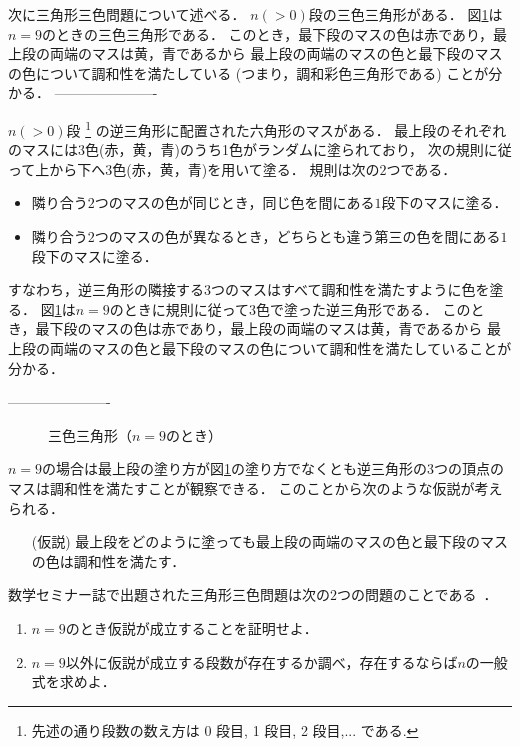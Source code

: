 次に三角形三色問題について述べる．
{\color{red}
  $n(>0)$段の三色三角形がある．
  図\ref{fig:nine_steps}は$n=9$のときの三色三角形である．
  このとき，最下段のマスの色は赤であり，最上段の両端のマスは黄，青であるから
  最上段の両端のマスの色と最下段のマスの色について調和性を満たしている (つまり，調和彩色三角形である) ことが分かる．
}
----------------------\\
{\color{blue}
$n(>0)$段
\footnote{
  先述の通り段数の数え方は 0 段目, 1 段目, 2 段目,... である.
  }
の逆三角形に配置された六角形のマスがある．
最上段のそれぞれのマスには$3$色(赤，黄，青)のうち1色がランダムに塗られており，
次の規則に従って上から下へ$3$色(赤，黄，青)を用いて塗る．
規則は次の$2$つである．
\begin{itemize}
  \item
    隣り合う$2$つのマスの色が同じとき，同じ色を間にある$1$段下のマスに塗る．
  \item
    隣り合う$2$つのマスの色が異なるとき，どちらとも違う第三の色を間にある$1$段下のマスに塗る．
\end{itemize}
すなわち，逆三角形の隣接する$3$つのマスはすべて調和性を満たすように色を塗る．
図\ref{fig:nine_steps}は$n=9$のときに規則に従って3色で塗った逆三角形である．
このとき，最下段のマスの色は赤であり，最上段の両端のマスは黄，青であるから
最上段の両端のマスの色と最下段のマスの色について調和性を満たしていることが分かる．
}
----------------------\\
\begin{figure}[h]
    \centering
    
    \caption{三色三角形（$n=9$のとき）}
    \label{fig:nine_steps}
\end{figure}

$n=9$の場合は最上段の塗り方が図\ref{fig:nine_steps}の塗り方でなくとも逆三角形の$3$つの頂点のマスは調和性を満たすことが観察できる．
このことから次のような仮説が考えられる．
\begin{itemize}
  \item[(仮説)]
  最上段をどのように塗っても最上段の両端のマスの色と最下段のマスの色は調和性を満たす．
\end{itemize}

数学セミナー誌で出題された三角形三色問題は次の$2$つの問題のことである~\cite{Nishiyama2}．
\begin{enumerate}
\item \label{que:1}
  $n=9$のとき仮説が成立することを証明せよ．
\item \label{que:2}
  $n=9$以外に仮説が成立する段数が存在するか調べ，存在するならば$n$の一般式を求めよ．
\end{enumerate}

